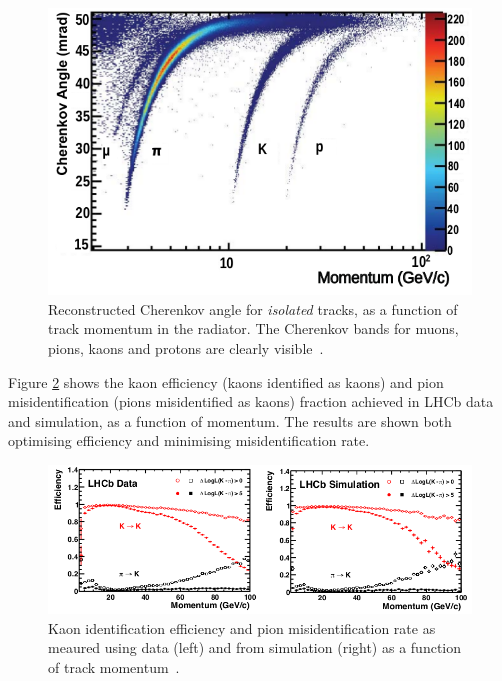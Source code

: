 \begin{figure} [htb!]
\begin{center}
\includegraphics[scale=0.7]{figs/PID3.png}
\caption{Reconstructed Cherenkov angle for \textit{isolated} tracks, as a function of track momentum in the radiator. The Cherenkov bands for muons, pions, kaons and protons are clearly visible~\cite{Aaij:2014jba}.\label{fig:PID3}}
\end{center}
\end{figure}

Figure \ref{fig:PID4} shows the kaon efficiency (kaons identified as kaons) and pion misidentification (pions misidentified as kaons) fraction achieved in LHCb data and simulation, as a function of momentum. The results are shown both optimising efficiency and minimising misidentification rate. 

\begin{figure} [htb!]
\begin{center}
\includegraphics[scale=0.7]{figs/PID4.png}
\caption{Kaon identification efficiency and pion misidentification rate as meaured using data (left) and from simulation (right) as a function of track momentum~\cite{Aaij:2014jba}.\label{fig:PID4}}
\end{center}
\end{figure}

